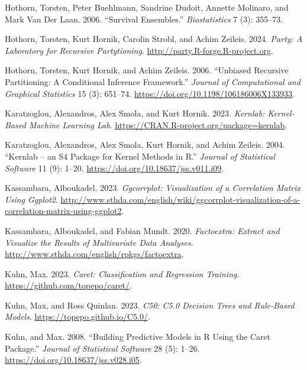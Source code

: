 \documentclass[
  notitlepage]{book}
\newlength{\cslhangindent}
\newenvironment{cslreferences}%
  {\setlength{\parindent}{0pt}%
  \everypar{\setlength{\hangindent}{\cslhangindent}}\ignorespaces}%
  {\par}
\begin{document}
\begin{cslreferences}
\leavevmode\hypertarget{ref-party2006b}{}%
Hothorn, Torsten, Peter Buehlmann, Sandrine Dudoit, Annette Molinaro, and Mark Van Der Laan. 2006. ``Survival Ensembles.'' \emph{Biostatistics} 7 (3): 355--73.

\leavevmode\hypertarget{ref-R-party}{}%
Hothorn, Torsten, Kurt Hornik, Carolin Strobl, and Achim Zeileis. 2024. \emph{Party: A Laboratory for Recursive Partytioning}. \url{http://party.R-forge.R-project.org}.

\leavevmode\hypertarget{ref-party2006a}{}%
Hothorn, Torsten, Kurt Hornik, and Achim Zeileis. 2006. ``Unbiased Recursive Partitioning: A Conditional Inference Framework.'' \emph{Journal of Computational and Graphical Statistics} 15 (3): 651--74. \url{https://doi.org/10.1198/106186006X133933}.

\leavevmode\hypertarget{ref-R-kernlab}{}%
Karatzoglou, Alexandros, Alex Smola, and Kurt Hornik. 2023. \emph{Kernlab: Kernel-Based Machine Learning Lab}. \url{https://CRAN.R-project.org/package=kernlab}.

\leavevmode\hypertarget{ref-kernlab2004}{}%
Karatzoglou, Alexandros, Alex Smola, Kurt Hornik, and Achim Zeileis. 2004. ``Kernlab -- an S4 Package for Kernel Methods in R.'' \emph{Journal of Statistical Software} 11 (9): 1--20. \url{https://doi.org/10.18637/jss.v011.i09}.

\leavevmode\hypertarget{ref-R-ggcorrplot}{}%
Kassambara, Alboukadel. 2023. \emph{Ggcorrplot: Visualization of a Correlation Matrix Using Ggplot2}. \url{http://www.sthda.com/english/wiki/ggcorrplot-visualization-of-a-correlation-matrix-using-ggplot2}.

\leavevmode\hypertarget{ref-R-factoextra}{}%
Kassambara, Alboukadel, and Fabian Mundt. 2020. \emph{Factoextra: Extract and Visualize the Results of Multivariate Data Analyses}. \url{http://www.sthda.com/english/rpkgs/factoextra}.

\leavevmode\hypertarget{ref-R-caret}{}%
Kuhn, Max. 2023. \emph{Caret: Classification and Regression Training}. \url{https://github.com/topepo/caret/}.

\leavevmode\hypertarget{ref-R-C50}{}%
Kuhn, Max, and Ross Quinlan. 2023. \emph{C50: C5.0 Decision Trees and Rule-Based Models}. \url{https://topepo.github.io/C5.0/}.

\leavevmode\hypertarget{ref-caret2008}{}%
Kuhn, and Max. 2008. ``Building Predictive Models in R Using the Caret Package.'' \emph{Journal of Statistical Software} 28 (5): 1--26. \url{https://doi.org/10.18637/jss.v028.i05}.


\end{cslreferences}
\end{document}
